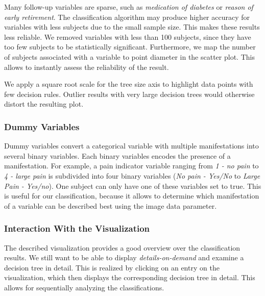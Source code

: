 \documentclass[a4paper,twoside]{style/article}
\newcommand{\com}[1]{\textcolor{orange}{\uline{#1}}}
\begin{document}
Many follow-up variables are sparse, such as \emph{medication of diabetes} or \emph{reason of early retirement}.
The classification algorithm may produce higher accuracy for variables with less subjects due to the small sample size.
This makes these results less reliable.
We removed variables with less than 100 subjects, since they have too few subjects to be statistically significant.
Furthermore, we map the number of subjects associated with a variable to point diameter in the scatter plot.
This allows to instantly assess the reliability of the result.

We apply a square root scale for the tree size axis to highlight data points with few decision rules.
Outlier results with very large decision trees would otherwise distort the resulting plot.

%
\subsubsection{Dummy Variables}
Dummy variables convert a categorical variable with multiple manifestations into several binary variables.
Each binary variables encodes the presence of a manifestation.
For example, a pain indicator variable ranging from \emph{1 - no pain} to \emph{4 - large pain} is subdivided into four binary variables (\emph{No pain - Yes/No} to \emph{Large Pain - Yes/no}).
One subject can only have one of these variables set to true.
This is useful for our classification, because it allows to determine which manifestation of a variable can be described best using the image data parameter.
\subsubsection{Interaction With the Visualization}
The described visualization provides a good overview over the classification results.
We still want to be able to display \emph{details-on-demand} \cite{shneiderman1996} and examine a decision tree in detail.
This is realized by clicking on an entry on the visualization, which then displays the corresponding decision tree in detail.
This allows for sequentially analyzing the classifications.
\end{document}
